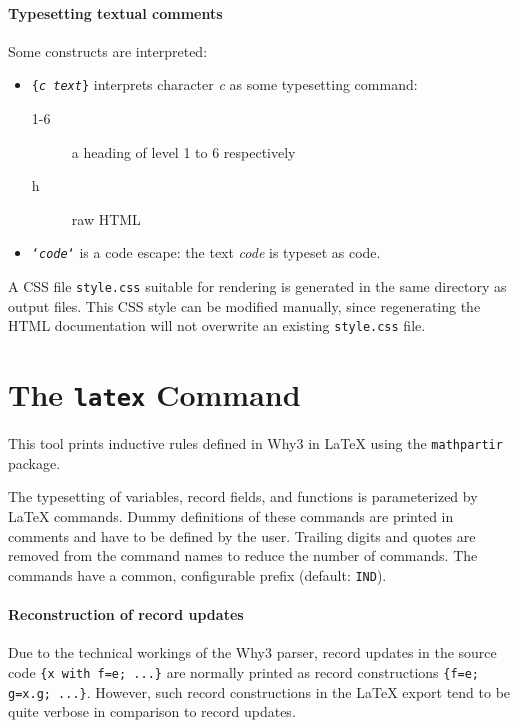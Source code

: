 \paragraph{Typesetting textual comments}

Some constructs are interpreted:
\begin{itemize}
\item \texttt{\{\textsl{c text}\}} interprets character \textsl{c} as
  some typesetting command:
  \begin{description}
  \item[1-6] a heading of level 1 to 6 respectively
  \item[h] raw HTML
  \end{description}
\item \texttt{`\textsl{code}`} is a code escape: the text
  \textsl{code} is typeset as \why code.
\end{itemize}

A CSS file \verb|style.css| suitable for rendering is generated in the
same directory as output files. This CSS style can be modified manually,
since regenerating the HTML documentation will not overwrite an existing
\verb|style.css| file.

\section{The \texttt{latex} Command}

This tool prints inductive rules defined in Why3 in LaTeX using the
\texttt{mathpartir} package.

The typesetting of variables, record fields, and functions is
parameterized by LaTeX commands. Dummy definitions of these commands are
printed in comments and have to be defined by the user. Trailing digits
and quotes are removed from the command names to reduce the number of
commands. The commands have a common, configurable prefix (default: \texttt{IND}).

\paragraph{Reconstruction of record updates}
Due to the technical workings of the Why3 parser, record updates in the
source code \texttt{\{x with f=e; ...\}} are normally printed as record
constructions \texttt{\{f=e; g=x.g; ...\}}. However, such record
constructions in the LaTeX export tend to be quite verbose in comparison
to record updates.

